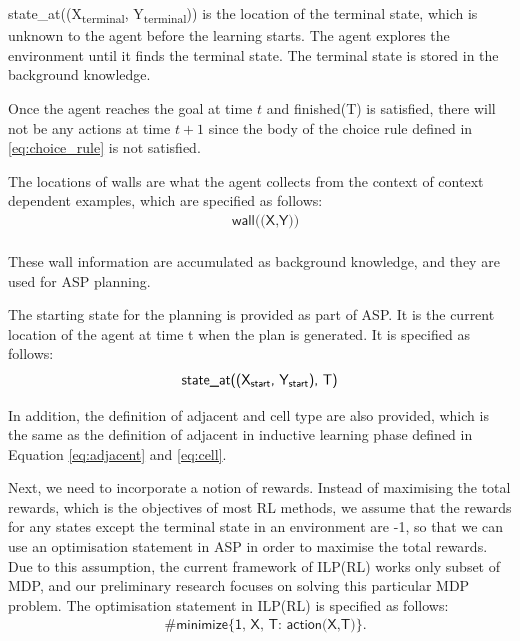 \textsf{state\_at((X\textsubscript{terminal}, Y\textsubscript{terminal}))} is the location of the terminal state, which is unknown to the agent before the learning starts.
The agent explores the environment until it finds the terminal state. The terminal state is stored in the background knowledge.

Once the agent reaches the goal at time $t$ and \textsf{finished(T)} is satisfied, 
there will not be any actions at time $t+1$ since the body of the choice rule defined in \ref{eq:choice_rule} is not satisfied.

The locations of walls are what the agent collects from the context of context dependent examples, which are specified as follows:
\begin{equation}
\begin{split}
&\textsf{wall((X,Y))}\\
\end{split}
\end{equation}
 
These wall information are accumulated as background knowledge, and they are used for ASP planning. 

The starting state for the planning is provided as part of ASP. It is the current location of the agent at time t when the plan is generated. It is specified as follows:
\begin{equation}
\begin{split}
\textsf{state\_at((X\textsubscript{start}, Y\textsubscript{start}), T)}
\end{split}
\end{equation}

In addition, the definition of adjacent and cell type are also provided, which is the same as the definition of adjacent in inductive learning phase defined in Equation \ref{eq:adjacent} and \ref{eq:cell}.

Next, we need to incorporate a notion of rewards. Instead of maximising the total rewards, which is the objectives of most RL methods, we assume that the rewards for any states except the terminal state in an environment are -1, so that we can use
an optimisation statement in ASP in order to maximise the total rewards. Due to this assumption, the current framework of ILP(RL) works only subset of MDP, and our preliminary research focuses on solving this particular MDP problem. 
The optimisation statement in ILP(RL) is specified as follows: 
\begin{equation}
\begin{split}
&\textsf{\#minimize\{1, X, T: action(X,T)\}}.
\end{split}
\end{equation}

